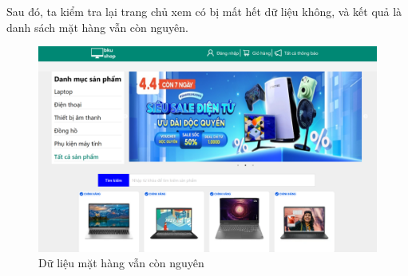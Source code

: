 \noindent Sau đó, ta kiểm tra lại trang chủ xem có bị mất hết dữ liệu không, và kết quả là danh sách mặt hàng vẫn còn nguyên.
\begin{figure}[H]
  \begin{center}
    \includegraphics[scale=0.4]{images/hanh/catalog-sts-result}
  \end{center}
  \caption{Dữ liệu mặt hàng vẫn còn nguyên}
  \label{}

\end{figure}

